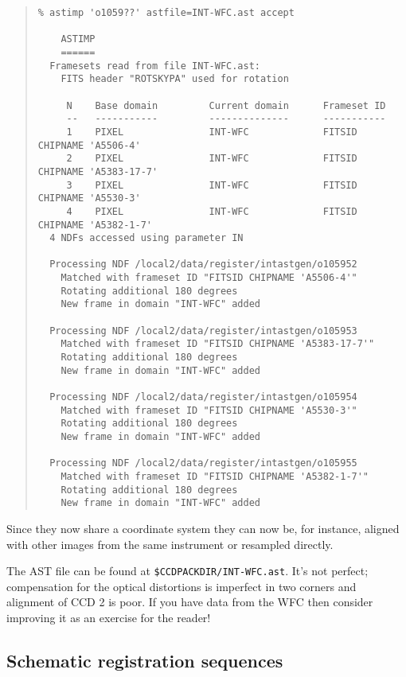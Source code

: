 \documentclass[twoside,11pt]{article}
\renewcommand{\_}{\texttt{\symbol{95}}}
\newenvironment{myquote}{\begin{quote}\begin{small}}{\end{small}\end{quote}}
\begin{document}
\begin{myquote}
\begin{verbatim}
% astimp 'o1059??' astfile=INT-WFC.ast accept

    ASTIMP
    ======
  Framesets read from file INT-WFC.ast:
    FITS header "ROTSKYPA" used for rotation

     N    Base domain         Current domain      Frameset ID
     --   -----------         --------------      -----------
     1    PIXEL               INT-WFC             FITSID CHIPNAME 'A5506-4'
     2    PIXEL               INT-WFC             FITSID CHIPNAME 'A5383-17-7'
     3    PIXEL               INT-WFC             FITSID CHIPNAME 'A5530-3'
     4    PIXEL               INT-WFC             FITSID CHIPNAME 'A5382-1-7'
  4 NDFs accessed using parameter IN

  Processing NDF /local2/data/register/intastgen/o105952
    Matched with frameset ID "FITSID CHIPNAME 'A5506-4'"
    Rotating additional 180 degrees
    New frame in domain "INT-WFC" added

  Processing NDF /local2/data/register/intastgen/o105953
    Matched with frameset ID "FITSID CHIPNAME 'A5383-17-7'"
    Rotating additional 180 degrees
    New frame in domain "INT-WFC" added

  Processing NDF /local2/data/register/intastgen/o105954
    Matched with frameset ID "FITSID CHIPNAME 'A5530-3'"
    Rotating additional 180 degrees
    New frame in domain "INT-WFC" added

  Processing NDF /local2/data/register/intastgen/o105955
    Matched with frameset ID "FITSID CHIPNAME 'A5382-1-7'"
    Rotating additional 180 degrees
    New frame in domain "INT-WFC" added
\end{verbatim}
\end{myquote}
Since they now share a coordinate system they can now be, for instance,
aligned with other images from the same instrument or resampled directly.

The AST file can be found at {\tt \$CCDPACK\_DIR/INT-WFC.ast}.
It's not perfect; 
compensation for the optical distortions is imperfect in two corners
and alignment of CCD 2 is poor.  
If you have data from the WFC then consider
improving it as an exercise for the reader!



\subsection{Schematic registration sequences}
\end{document}

